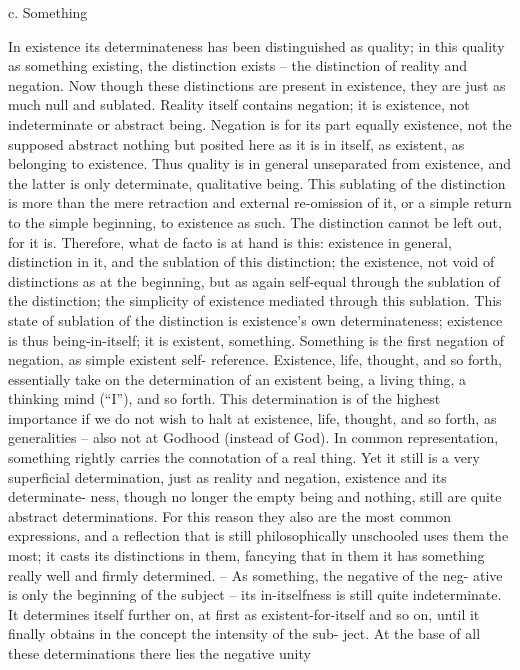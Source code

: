 c. Something

In existence its determinateness has been distinguished as quality; in this
quality as something existing, the distinction exists – the distinction of
reality and negation. Now though these distinctions are present in existence,
they are just as much null and sublated. Reality itself contains negation; it
is existence, not indeterminate or abstract being. Negation is for its part
equally existence, not the supposed abstract nothing but posited here as it
is in itself, as existent, as belonging to existence. Thus quality is in general
unseparated from existence, and the latter is only determinate, qualitative
being.
This sublating of the distinction is more than the mere retraction and
external re-omission of it, or a simple return to the simple beginning, to
existence as such. The distinction cannot be left out, for it is. Therefore,
what de facto is at hand is this: existence in general, distinction in it, and the
sublation of this distinction; the existence, not void of distinctions as at the
beginning, but as again self-equal through the sublation of the distinction;
the simplicity of existence mediated through this sublation. This state of
sublation of the distinction is existence’s own determinateness; existence is
thus being-in-itself; it is existent, something.
Something is the first negation of negation, as simple existent self-
reference. Existence, life, thought, and so forth, essentially take on the
determination of an existent being, a living thing, a thinking mind (“I”),
and so forth. This determination is of the highest importance if we do not
wish to halt at existence, life, thought, and so forth, as generalities – also
not at Godhood (instead of God). In common representation, something
rightly carries the connotation of a real thing. Yet it still is a very superficial
determination, just as reality and negation, existence and its determinate-
ness, though no longer the empty being and nothing, still are quite abstract
determinations. For this reason they also are the most common expressions,
and a reflection that is still philosophically unschooled uses them the most;
it casts its distinctions in them, fancying that in them it has something
really well and firmly determined. – As something, the negative of the neg-
ative is only the beginning of the subject – its in-itselfness is still quite
indeterminate. It determines itself further on, at first as existent-for-itself
and so on, until it finally obtains in the concept the intensity of the sub-
ject. At the base of all these determinations there lies the negative unity
